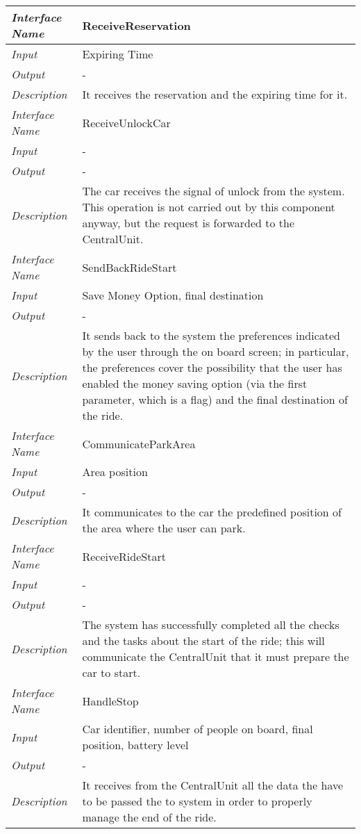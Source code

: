 \begin{longtable}{|>{\em}l|X|}
	\hline
	Interface Name& ReceiveReservation\\
	\hline
	Input & Expiring Time\\
	\hline
	Output & -\\
	\hline
	Description &It receives the reservation and the expiring time for it.\\
	\hline
	\hline
	Interface Name& ReceiveUnlockCar\\
	\hline
	Input & -\\
	\hline
	Output & -\\
	\hline
	Description &The car receives the signal of unlock from the system. This operation is not carried out by this component anyway, but the request is forwarded to the CentralUnit. \\
	\hline
	\hline
	Interface Name& SendBackRideStart\\
	\hline
	Input & Save Money Option, final destination\\
	\hline
	Output & -\\
	\hline
	Description &It sends back to the system the preferences indicated by the user through the on board screen; in particular, the preferences cover the possibility that the user has enabled the money saving option (via the first parameter, which is a flag) and the final destination of the ride.\\
	\hline
	\hline
	Interface Name& CommunicateParkArea\\
	\hline
	Input & Area position\\
	\hline
	Output & -\\
	\hline
	Description &It communicates to the car the predefined position of the area where the user can park.\\
	\hline
	\hline
	Interface Name& ReceiveRideStart\\
	\hline
	Input & -\\
	\hline
	Output & -\\
	\hline
	Description &The system has successfully completed all the checks and the  tasks about the start of the ride; this will communicate the CentralUnit that it must prepare the car to start.\\
	\hline
	\hline
	Interface Name& HandleStop\\
	\hline
	Input & Car identifier, number of people on board, final position, battery level\\
	\hline
	Output & -\\
	\hline
	Description &It receives from the CentralUnit all the data the have to be passed the to system in order to properly manage the end of the ride.\\

\end{longtable}

